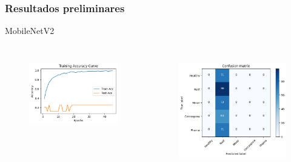 \documentclass[aspectratio=169]{beamer}
\begin{document}






\begin{frame}
    \frametitle{Resultados preliminares}


    \centering
    MobileNetV2


    \begin{columns}


        \begin{figure}
            \centering
            \includegraphics[scale = 0.5]{img/mobiletraincurve.png}
            \label{fig:enter-label}
        \end{figure}




        \begin{figure}
            \centering
            \includegraphics[scale = 0.5]{img/mobileresults.png}
            \label{fig:enter-label}
        \end{figure}




\end{columns}
\end{frame}
\end{document}
